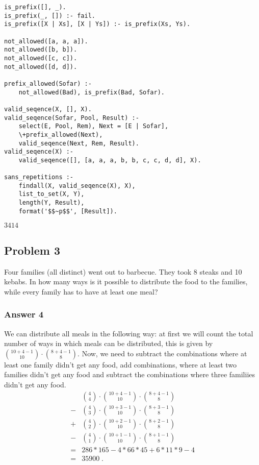 \documentclass[11pt]{article}
\begin{document}
\lstset{language=prolog,label= ,caption= ,captionpos=b,numbers=none}
\begin{lstlisting}
is_prefix([], _).
is_prefix(_, []) :- fail.
is_prefix([X | Xs], [X | Ys]) :- is_prefix(Xs, Ys).

not_allowed([a, a, a]).
not_allowed([b, b]).
not_allowed([c, c]).
not_allowed([d, d]).

prefix_allowed(Sofar) :-
    not_allowed(Bad), is_prefix(Bad, Sofar).

valid_seqence(X, [], X).
valid_seqence(Sofar, Pool, Result) :-
    select(E, Pool, Rem), Next = [E | Sofar],
    \+prefix_allowed(Next),
    valid_seqence(Next, Rem, Result).
valid_seqence(X) :-
    valid_seqence([], [a, a, a, b, b, c, c, d, d], X).

sans_repetitions :-
    findall(X, valid_seqence(X), X),
    list_to_set(X, Y),
    length(Y, Result),
    format('$$~p$$', [Result]).
\end{lstlisting}

\(3414\)

\subsection{Problem 3}
\label{sec:orgheadline7}
Four families (all distinct) went out to barbecue.  They took 8 steaks and 10
kebabs.  In how many ways is it possible to distribute the food to the
families, while every family has to have at least one meal?

\subsubsection{Answer 4}
\label{sec:orgheadline6}
We can distribute all meals in the following way: at first we will count
the total number of ways in which meals can be distributed, this is given by
\({10 + 4 - 1\choose 10}\cdot{8 + 4 - 1\choose 8}\).  Now, we need to subtract
the combinations where at least one family didn't get any food, add combinations,
where at least two families didn't get any food and subtract the combinations
where three familiies didn't get any food.
\begin{align*}
   & {4\choose 4} \cdot {10 + 4 - 1\choose 10} \cdot {8 + 4 - 1\choose 8} \\
  -& {4\choose 3} \cdot {10 + 3 - 1\choose 10} \cdot {8 + 3 - 1\choose 8} \\
  +& {4\choose 2} \cdot {10 + 2 - 1\choose 10} \cdot {8 + 2 - 1\choose 8} \\
  -& {4\choose 1} \cdot {10 + 1 - 1\choose 10} \cdot {8 + 1 - 1\choose 8} \\
  =& {} 286 * 165 - 4 * 66 * 45 + 6 * 11 * 9 - 4 \\
  =& {} 35900\;.
\end{align*}
\end{document}

